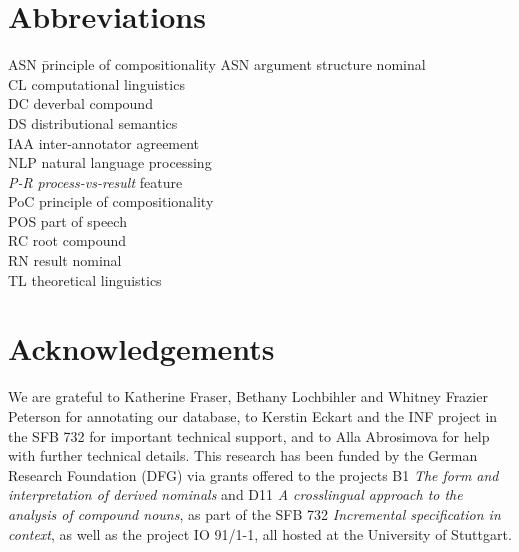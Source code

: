\documentclass[output=paper]{langsci/langscibook}
\begin{document}
\section*{Abbreviations}
\begin{multicols}{2}
 \begin{tabbing}
 ASN\hspace{1em} \= principle of compositionality\kill
 ASN \> argument structure nominal\\
 CL \> computational linguistics\\
 DC \> deverbal compound\\
 DS \> distributional semantics\\
 IAA \> inter-annotator agreement\\
 NLP \> natural language processing\\
 \textit{P-R} \> \textit{process-vs-result} feature\\
 PoC \> principle of compositionality\\
 POS \> part of speech\\
 RC \> root compound\\
 RN \> result nominal\\
 TL \> theoretical linguistics
 \end{tabbing}
\end{multicols}

\section*{Acknowledgements}
We are grateful to Katherine Fraser, Bethany Lochbihler and Whitney Frazier Peterson for annotating our database, to Kerstin Eckart and the INF project in the SFB 732 for important technical support, and to Alla Abrosimova for help with further technical details. This research has been funded by the German Research Foundation (DFG) via grants offered to the projects B1 \textit{The form and interpretation of derived nominals} and D11 \textit{A crosslingual approach to the analysis of compound nouns}, as part of the SFB 732 \textit{Incremental specification in context}, as well as the project IO 91/1-1, all hosted at the University of Stuttgart.

{\sloppy\printbibliography[heading=subbibliography,notkeyword=this]}
\end{document}
